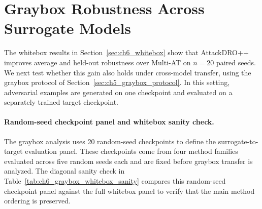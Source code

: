\section{Graybox Robustness Across Surrogate Models}
\label{sec:ch6_graybox}

The whitebox results in Section~\ref{sec:ch6_whitebox} show that
AttackDRO++ improves average and held-out robustness over Multi-AT on
\(n=20\) paired seeds. We next test whether this gain also holds under
cross-model transfer, using the graybox protocol of
Section~\ref{sec:ch5_graybox_protocol}. In this setting, adversarial examples
are generated on one checkpoint and evaluated on a separately trained
target checkpoint.

\paragraph{Random-seed checkpoint panel and whitebox sanity check.}

The graybox analysis uses 20 random-seed checkpoints to define the
surrogate-to-target evaluation panel. These checkpoints come from four method
families evaluated across five random seeds each and are fixed before graybox
transfer is analyzed. The diagonal sanity check in
Table~\ref{tab:ch6_graybox_whitebox_sanity} compares this
random-seed checkpoint panel against the full whitebox panel to verify that the
main method ordering is preserved.




